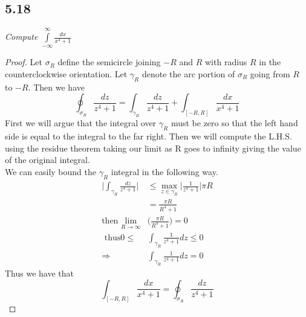 \documentclass[a4paper, 11pt]{article}
\begin{document}
\subsection*{5.18} 
	\textit{Compute  $\int\limits_{-\infty}^{\infty}\frac{dx}{x^4+1}$}	
	\begin{proof}
		Let $\sigma_R$ define the semicircle joining $-R$ and $R$ with radius $R$ in the counterclockwise orientation. Let $\gamma_R$ denote the arc portion of $\sigma_R$ going from $R$ to $-R$. Then we have 
			\begin{equation*}
				\oint_{\sigma_R} \frac{dz}{z^4+1} = \int_{\gamma_R}\frac{dz}{z^4+1} + \int_{[-R,R]}\frac{dx}{x^4+1}
			\end{equation*} 
		\noindent First we will argue that the integral over $\gamma_R$ must be zero so that the left hand side is equal to the integral to the far right. Then we will compute the L.H.S. using the residue theorem taking our limit as R goes to infinity giving the value of the original integral. \\ 
		
		\noindent We can easily bound the $\gamma_R$ integral in the following way. 
			\begin{align*}
				\Big|\int_{\gamma_R}\frac{dz}{z^4+1}\Big| &\leq \max_{z\in\gamma_R}\Big|\frac{1}{z^4+1}\Big|\pi R \\ 
					&= \frac{\pi R}{R^4+1} \\ 
				\text{then } \lim\limits_{R\to\infty}&\Big(\frac{\pi R}{R^4+1}\Big)= 0 \\ 
				\text{ thus} 0 \leq &\int_{\gamma_R}\frac{1}{z^4+1}dz \leq 0 \\ 
				\Rightarrow &\int_{\gamma_R}\frac{1}{z^4+1}dz = 0
			\end{align*}
		\noindent Thus we have that 
			\begin{equation*}
				\int_{[-R,R]}\frac{dx}{x^4+1} = \oint_{\sigma_R} \frac{dz}{z^4+1}
			\end{equation*}
		

\end{proof}
\end{document}
